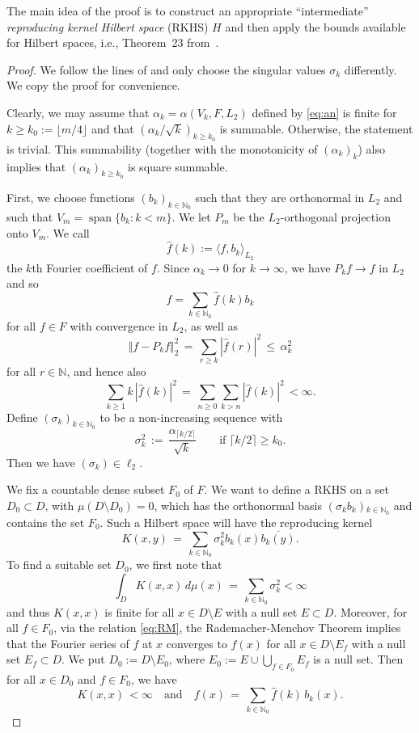 \documentclass[a4paper,12pt]{amsart}
\theoremstyle{definition}
\theoremstyle{remark}
\begin{document}
The main idea 
of the proof is to construct an appropriate ``intermediate'' 
\emph{reproducing kernel Hilbert space} {(RKHS)} $H$ and then apply the bounds available for Hilbert spaces, 
i.e., Theorem~23 from~\cite{DKU}.

\begin{proof}
{We follow the lines of \cite[Proof of Theorem~3]{DKU} and only choose the singular values $\sigma_k$ differently. We copy the proof for convenience. 

Clearly, we may assume that $\alpha_k= \alpha(V_k,F, L_2)$ {defined by \eqref{eq:an}} 
is finite for $k\ge k_0 := \lfloor m/4\rfloor$ and that $(\alpha_k/\sqrt k)_{k\ge k_0}$ is summable. Otherwise, the statement is trivial.
This summability (together with the monotonicity of $(\alpha_k)_k$) also implies that $(\alpha_k)_{k\ge k_0}$ is square summable.

First, we choose functions $(b_k)_{k\in \mathbb{N}_0}$ such that they are orthonormal in $L_2$ and such that $V_m = \operatorname{span}\{b_k\colon k<m\}$.
We let $P_m$ be the $L_2$-orthogonal projection onto $V_m$.
We call $$\hat f(k) := \langle f, b_k\rangle_{L_2}$$
the $k$th Fourier coefficient of $f$.
Since $\alpha_k \to 0$ for $k\to \infty$,
we have $P_k f \to f$ in $L_2$ and so
\[
 f = \sum_{k\in\mathbb{N}_0} \hat f(k) b_k
\]
for all $f\in F$ with convergence in $L_2$,
as well as
\[
 \Vert f - P_k f \Vert_2^2 \,=\, \sum_{r\ge k} |\hat f(r)|^2 \,\le\, \alpha_k^2
\]
for all $r\in \mathbb{N}$,
and hence also
\begin{equation}\label{eq:RM}
 \sum_{k\ge 1} k\, |\hat f(k)|^2 
 \,=\, \sum_{n\ge 0} \sum_{k>n} |\hat f(k)|^2
 \, < \infty.
\end{equation}
Define $(\sigma_k)_{k\in\mathbb{N}_0}$ to be a non-increasing sequence with
\begin{equation*}%
\sigma_k^2 \,:=\, 
\frac{\alpha_{\lceil k/2\rceil}}{\sqrt{k}}
\qquad \text{if } \lceil k/2\rceil \ge k_0.
\end{equation*}
Then we have $(\sigma_k)\in\ell_2$.


We fix a countable dense subset $F_0$ of $F$.
We want to define a 
RKHS on a set $D_0 \subset D$,
with $\mu(D\setminus D_0)=0$, which has the orthonormal basis $(\sigma_k b_k){_{k\in \mathbb{N}_0}}$
and contains the set $F_0$.
Such a Hilbert space will have the reproducing kernel 
\[
 K(x,y) \,=\, \sum_{k\in\mathbb{N}_0} \sigma_k^2 b_k(x) \overline{b_k(y)}.
\]
To find a suitable set $D_0$, we first note that 
\begin{equation}\label{eq:traceofH}
 \int_D K(x,x)\,d\mu(x) \,=\, \sum_{k\in\mathbb{N}_0} \sigma_k^2 < \infty
\end{equation}
and thus $K(x,x)$ is finite for all $x\in D\setminus E$
with a null set $E\subset D$.
Moreover, for all $f\in F_0$, via the relation \eqref{eq:RM},
the Rademacher-Menchov Theorem implies that 
the Fourier series of $f$ at $x$ converges to $f(x)$ 
for all $x\in D\setminus E_f$ with a null set $E_f\subset D$.
We put 
$D_0 := D \setminus E_0$, where
$
 E_0 := E \cup \bigcup_{f\in F_0} E_f
$
is a null set.
Then
for all $x\in D_0$ and $f\in F_0$, we have
\[
 K(x,x) \,< \infty
\quad \text{and} \quad
 f(x) \,=\, \sum_{k\in \mathbb{N}_0} \hat f(k)\, b_k (x).
\]


}
\end{proof}
\end{document}
